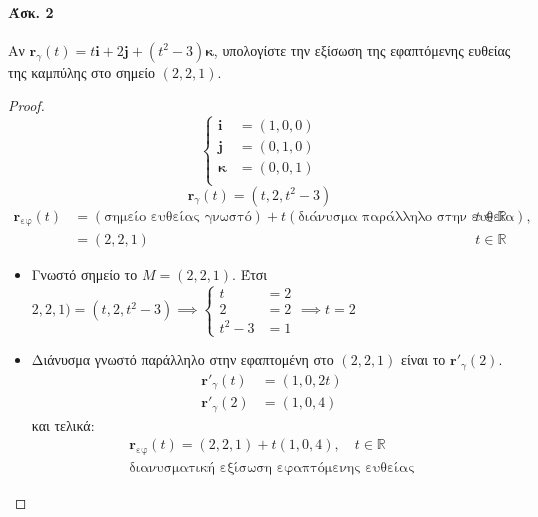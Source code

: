 \documentclass[11pt,a4paper,titlepage,draft]{article}
\begin{document}
\paragraph{Άσκ. 2}
Αν \( \mathbf r_\gamma(t) = t \mathbf i+2 \mathbf j + (t^2-3) \mathbf \kappa\), υπολογίστε την εξίσωση της εφαπτόμενης ευθείας της καμπύλης στο σημείο \((2,2,1)\).
\begin{proof}
\[
\begin{cases}
\mathbf i &= (1,0,0) \\
\mathbf j &= (0,1,0) \\
\mathbf \kappa &= (0,0,1) \\
\end{cases}
\]
\[ \mathbf r_\gamma(t) = \left( t,2,t^2-3 \right) \]
\begin{align*}
\mathbf r_\text{εφ}(t) &= 
\left( \text{σημείο ευθείας γνωστό} \right) +
t \left( \text{διάνυσμα παράλληλο στην ευθεία} \right), \quad & t \in  \mathbb R 
\\ &=
(2,2,1) & t \in \mathbb R
\end{align*}
\begin{itemize}
\item Γνωστό σημείο το \(M=(2,2,1)\). Έτσι
\(2,2,1) = (t,2,t^2-3) \implies
\begin{cases}
t&=2\\2&=2\\t^2-3&=1
\end{cases}
\implies t=2
\)
\item Διάνυσμα γνωστό παράλληλο στην εφαπτομένη στο \((2,2,1)\) είναι το
\( \mathbf r'_\gamma(2)\).
\begin{align*}
 \mathbf r'_\gamma(t) &= (1,0,2t) \\
 \mathbf r'_\gamma(2) &= (1,0,4)
\end{align*}
και τελικά:
\begin{align*}
\boxed{
\mathbf r_\text{εφ}(t) = (2,2,1) + t(1,0,4), \quad t \in \mathbb R
}\\
\text{διανυσματική εξίσωση εφαπτόμενης ευθείας}
\end{align*}
\end{itemize}

\end{proof}
\end{document}

